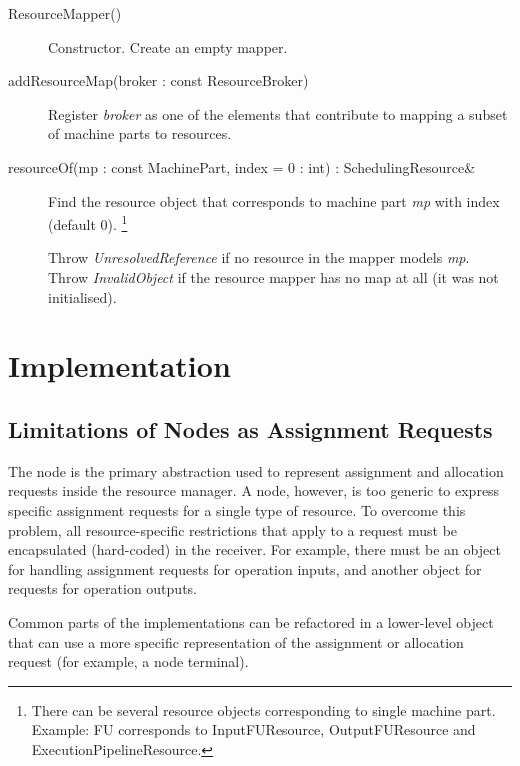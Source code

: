 \documentclass[a4paper,twoside]{tce}
\begin{document}
\begin{description}
\item[ResourceMapper()]%
  Constructor. Create an empty mapper.
\item[addResourceMap(broker : const ResourceBroker)]%
  Register \emph{broker} as one of the elements that contribute to mapping
  a subset of machine parts to resources.
\item[resourceOf(mp : const MachinePart, index = 0 : int) :
SchedulingResource\&]%
  Find the resource object that corresponds to machine part \emph{mp} with
  index (default 0). \footnote{There can be several resource objects
  corresponding to single machine part. Example: FU corresponds to
  InputFUResource, OutputFUResource and ExecutionPipelineResource.}

  Throw \emph{UnresolvedReference} if no resource in the mapper models
  \emph{mp}. Throw \emph{InvalidObject}
%
%
  if the resource mapper has no map at all (it was not initialised).
\end{description}

\section{Implementation}

\subsection{Limitations of Nodes as Assignment Requests}
\label{ssec:nodes-assignment-requests}

The node is the primary abstraction used to represent assignment and
allocation requests inside the resource manager. A node, however, is too
generic to express specific assignment requests for a single type of
resource.
%
To overcome this problem, all resource-specific restrictions that apply to a
request must be encapsulated (hard-coded) in the receiver. For example, there
must be an object for handling assignment requests for operation inputs, and
another object for requests for operation outputs.

Common parts of the implementations can be refactored in a lower-level
object that can use a more specific representation of the assignment or
allocation request (for example, a node terminal).
\end{document}
